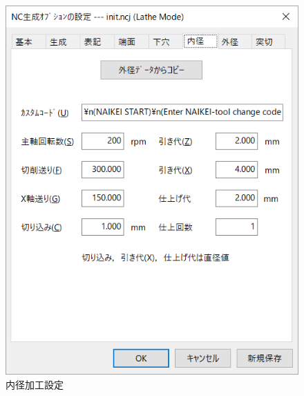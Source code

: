 \begin{minipage}{0.5\textwidth}
\begin{figure}[H]
\centering
\includegraphics[scale=0.7]{No2/fig/ncj3.png}
\caption{内径加工設定}
\label{fig:ncj3.png}
\end{figure}
\end{minipage}
